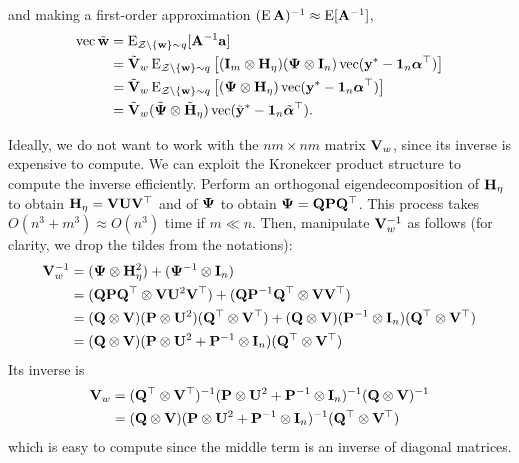 and making a first-order approximation $(\operatorname{E} {\mathbf A} )^{-1} \approx \operatorname{E} [{\mathbf A}^{-1}]$\footnotemark,
\begin{align*}
  \operatorname{vec} \tilde{\mathbf w} 
  &= \operatorname{E}_{{\mathcal Z}\backslash\{{\mathbf w} \}\sim q} [{\mathbf A}^{-1}{\mathbf a}] \\
  &= \tilde{{\mathbf V}}_w \operatorname{E}_{{\mathcal Z}\backslash\{{\mathbf w} \}\sim q} \big[({\mathbf I}_m \otimes {\mathbf H}_\eta) ({\bm\Psi} \otimes {\mathbf I}_n) \operatorname{vec}({\mathbf y}^* - {\mathbf 1}_n{\bm\alpha}^\top)  \big] \\
  &= \tilde{{\mathbf V}}_w \operatorname{E}_{{\mathcal Z}\backslash\{{\mathbf w} \}\sim q} \big[({\bm\Psi} \otimes {\mathbf H}_\eta) \operatorname{vec}({\mathbf y}^* - {\mathbf 1}_n{\bm\alpha}^\top)  \big] \\
  &= \tilde{{\mathbf V}}_w (\tilde{{\bm\Psi}} \otimes \tilde{{\mathbf H}}_\eta) \operatorname{vec}(\tilde{{\mathbf y}}^* - {\mathbf 1}_n\tilde{{\bm\alpha}}^\top).
\end{align*}


Ideally, we do not want to work with the $nm \times nm$ matrix ${\mathbf V}_w$, since its inverse is expensive to compute.
We can exploit the Kronekcer product structure to compute the inverse efficiently.
Perform an orthogonal eigendecomposition of ${\mathbf H}_\eta$ to obtain ${\mathbf H}_\eta = {\mathbf V}{\mathbf U}{\mathbf V}^\top$ and of ${\bm\Psi}$ to obtain ${\bm\Psi} = {\mathbf Q}{\mathbf P}{\mathbf Q}^\top$.
This process takes $O(n^3 + m^3) \approx O(n^3)$ time if $m\ll n$.
Then, manipulate ${\mathbf V}_w^{-1}$ as follows (for clarity, we drop the tildes from the notations):
\begin{align*}
  {\mathbf V}_w^{-1} 
  &= ({\bm\Psi} \otimes {\mathbf H}_\eta^2) + ({\bm\Psi}^{-1} \otimes {\mathbf I}_n) \\
  &= ({\mathbf Q}{\mathbf P}{\mathbf Q}^\top \otimes {\mathbf V}{\mathbf U}^2{\mathbf V}^\top) + ({\mathbf Q}{\mathbf P}^{-1}{\mathbf Q}^\top \otimes {\mathbf V}{\mathbf V}^\top) \\
  &= ({\mathbf Q} \otimes {\mathbf V})({\mathbf P} \otimes {\mathbf U}^2)({\mathbf Q}^\top \otimes {\mathbf V}^\top) + 
  ({\mathbf Q} \otimes {\mathbf V})({\mathbf P}^{-1} \otimes {\mathbf I}_n)({\mathbf Q}^\top \otimes {\mathbf V}^\top) \\
  &= ({\mathbf Q} \otimes {\mathbf V})({\mathbf P} \otimes {\mathbf U}^2 + {\mathbf P}^{-1} \otimes {\mathbf I}_n)({\mathbf Q}^\top \otimes {\mathbf V}^\top) 
\end{align*}
Its inverse is 
\begin{align*}
  {\mathbf V}_w 
  &=  ({\mathbf Q}^\top \otimes {\mathbf V}^\top)^{-1}({\mathbf P} \otimes {\mathbf U}^2 + {\mathbf P}^{-1} \otimes {\mathbf I}_n)^{-1} ({\mathbf Q} \otimes {\mathbf V})^{-1} \\
  &= ({\mathbf Q} \otimes {\mathbf V})({\mathbf P} \otimes {\mathbf U}^2 + {\mathbf P}^{-1} \otimes {\mathbf I}_n)^{-1}({\mathbf Q}^\top \otimes {\mathbf V}^\top)
\end{align*}
which is easy to compute since the middle term is an inverse of diagonal matrices.

